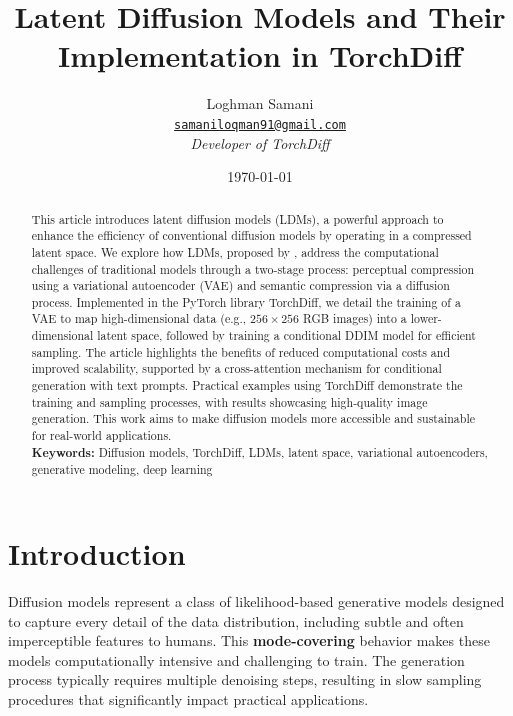 \documentclass[12pt,twoside]{article}
\begin{document}
\title{\textbf{\LARGE Latent Diffusion Models and Their Implementation in TorchDiff}}
\author{
    Loghman Samani\\
    \href{mailto:samaniloqman91@gmail.com}{\texttt{samaniloqman91@gmail.com}}\\
    \textit{Developer of TorchDiff}
}
\date{\monthdayyeardate\today}

\maketitle
\thispagestyle{empty}

\begin{abstract}
This article introduces latent diffusion models (LDMs), a powerful approach to enhance the efficiency of conventional diffusion models by operating in a compressed latent space. We explore how LDMs, proposed by \cite{rombach2022high}, address the computational challenges of traditional models through a two-stage process: perceptual compression using a variational autoencoder (VAE) and semantic compression via a diffusion process. Implemented in the PyTorch library TorchDiff, we detail the training of a VAE to map high-dimensional data (e.g., $256 \times 256$ RGB images) into a lower-dimensional latent space, followed by training a conditional DDIM model for efficient sampling. The article highlights the benefits of reduced computational costs and improved scalability, supported by a cross-attention mechanism for conditional generation with text prompts. Practical examples using TorchDiff \cite{torchdiff} demonstrate the training and sampling processes, with results showcasing high-quality image generation. This work aims to make diffusion models more accessible and sustainable for real-world applications.\\[5px]

\textbf{Keywords:} Diffusion models, TorchDiff, LDMs, latent space, variational autoencoders, generative modeling, deep learning
\end{abstract}

\newpage
\tableofcontents
\newpage

\section{Introduction}
\label{sec:introduction}

Diffusion models represent a class of likelihood-based generative models designed to capture every detail of the data distribution, including subtle and often imperceptible features to humans. This \textbf{mode-covering} behavior makes these models computationally intensive and challenging to train. The generation process typically requires multiple denoising steps, resulting in slow sampling procedures that significantly impact practical applications.
\end{document}
